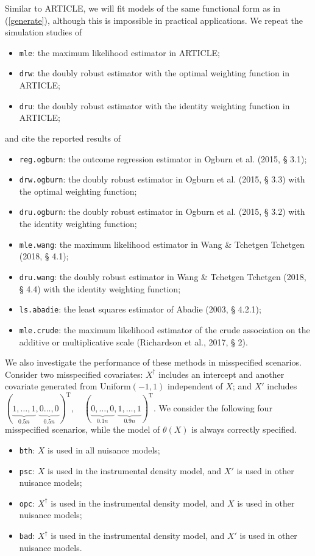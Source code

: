 \documentclass{article}
\begin{document}
Similar to ARTICLE, we will fit models of the same functional form as in (\ref*{generate}), although this is impossible in practical applications. We repeat the simulation studies of 
\begin{itemize}
  \item \texttt{mle}: the maximum likelihood estimator in ARTICLE;
  \item \texttt{drw}: the doubly robust estimator with the optimal weighting function in ARTICLE; 
  \item \texttt{dru}: the doubly robust estimator with the identity weighting function in ARTICLE;
\end{itemize}
and cite the reported results of
\begin{itemize}
  \item \texttt{reg.ogburn}: the outcome regression estimator in Ogburn et al. (2015, § 3.1);
  \item\texttt{drw.ogburn}: the doubly robust estimator in Ogburn et al. (2015, § 3.3) with the optimal weighting function;
  \item\texttt{dru.ogburn}: the doubly robust estimator in Ogburn et al. (2015, § 3.2) with the identity weighting function;
  \item\texttt{mle.wang}: the maximum likelihood estimator in Wang \& Tchetgen Tchetgen (2018, § 4.1);
  \item\texttt{dru.wang}: the doubly robust estimator in Wang \& Tchetgen Tchetgen (2018, § 4.4) with the identity weighting function;
  \item\texttt{ls.abadie}: the least squares estimator of Abadie (2003, § 4.2.1);
  \item\texttt{mle.crude}: the maximum likelihood estimator of the crude association on the additive or multiplicative scale (Richardson et al., 2017, § 2).
\end{itemize}

We also investigate the performance of these methods in misspecified scenarios. Consider two misspecified covariates: $X^\dagger$ includes an intercept and another covariate generated from Uniform$(-1,1)$ independent of $X$; and $X'$ includes $ (\underbrace{1, \ldots, 1}_{0.5 n}, \underbrace{0 \ldots, 0}_{0.5 n})^{\mathrm{T}}, \quad(\underbrace{0, \ldots, 0}_{0.1 n}, \underbrace{1, \ldots, 1}_{0.9 n})^{\mathrm{T}}$. We consider the following four misspecified scenarios, while the model of $\theta(X)$ is always correctly specified.
\begin{itemize}
  \item \texttt{bth}: $X$ is used in all nuisance models;
  \item \texttt{psc}: $X$ is used in the instrumental density model, and $X'$ is used in other nuisance models;
  \item \texttt{opc}: $X^\dagger$ is used in the instrumental density model, and $X$ is used in other nuisance models;
  \item \texttt{bad}: $X^\dagger$ is used in the instrumental density model, and $X'$ is used in other nuisance models.
\end{itemize}
\end{document}

